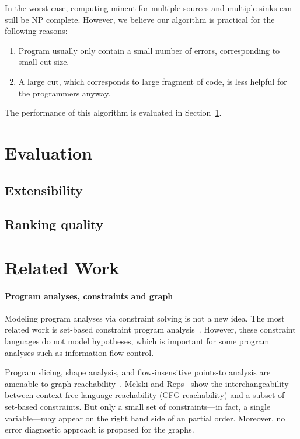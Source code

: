 In the worst case, computing mincut for multiple sources and multiple sinks can
still be NP complete. However, we believe our algorithm is practical for the
following reasons:
\begin{enumerate}
\item Program usually only contain a small number of errors, corresponding to
small cut size.

\item A large cut, which corresponds to large fragment of code, is less helpful
for the programmers anyway.
\end{enumerate}

The performance of this algorithm is evaluated in Section~\ref{sec:evaluation}.

\section{Evaluation}
\label{sec:evaluation}

\subsection{Extensibility}

\subsection{Ranking quality}

\section{Related Work}

\paragraph{Program analyses, constraints and graph} 

Modeling program analyses via constraint solving is not a new idea.
The most related work is set-based constraint program
analysis~\cite{aiken-setconstraint, aiken-typeinclusion}.  However,
these constraint languages do not model hypotheses, which is important
for some program analyses such as information-flow control.
 
Program slicing, shape analysis, and flow-insensitive points-to
analysis are amenable to graph-reachability~\cite{reps-graph}. Melski
and Reps~\cite{melski-cflgraph} show the interchangeability between
context-free-language reachability (CFG-reachability) and a subset of
set-based constraints. But only a small set of constraints---in fact,
a single variable---may appear on the right hand side of an partial
order. Moreover, no error diagnostic approach is proposed for the
graphs.

